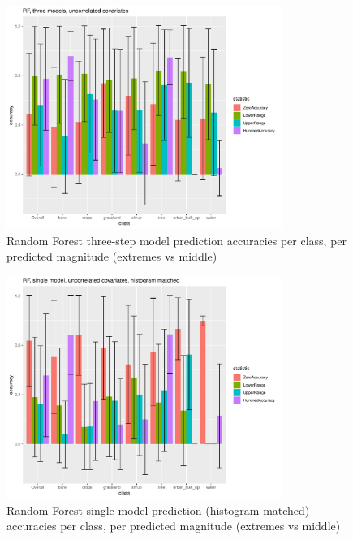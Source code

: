 \documentclass[a4paper,10pt]{article}
\begin{document}
\begin{figure}
    \includegraphics[width=0.8\textwidth]{article-figures/barplots/2019-03-19-rf-3m-uncor-bar}
    \caption{Random Forest three-step model prediction accuracies per class, per predicted magnitude (extremes vs middle)}
    \label{bar-rf-3m-uncor}
\end{figure}
\begin{figure}
    \includegraphics[width=0.8\textwidth]{article-figures/barplots/2019-03-22-rf-1m-uncor-hm-bar}
    \caption{Random Forest single model prediction (histogram matched) accuracies per class, per predicted magnitude (extremes vs middle)}
    \label{bar-rf-1m-uncor-hm}
\end{figure}
\end{document}
